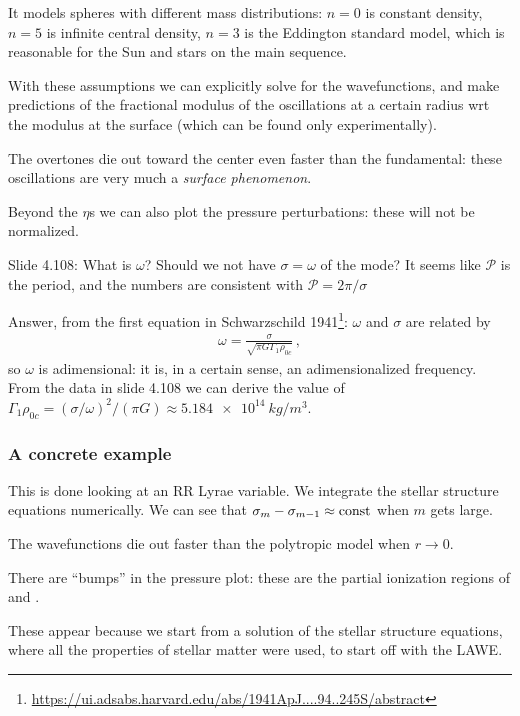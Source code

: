\documentclass[main.tex]{subfiles}
\begin{document}
It models spheres with different mass distributions:
\(n=0\) is constant density, \(n=5\) is infinite central density, \(n=3\) is the Eddington standard model, which is reasonable for the Sun and stars on the main sequence.

With these assumptions we can explicitly solve for the wavefunctions, and make predictions of the fractional modulus of the oscillations at a certain radius wrt the modulus at the surface (which can be found only experimentally).

The overtones die out toward the center even faster than the fundamental: these oscillations are very much a \emph{surface phenomenon}.

Beyond the \(\eta\)s we can also plot the pressure perturbations: these will not be normalized.

\begin{bluebox}
Slide 4.108: What is \(\omega \)? Should we not have \(\sigma = \omega \) of the mode? It seems like \(\mathcal{P}\) is the period, and the numbers are consistent with \(\mathcal{P} = 2 \pi / \sigma \)

Answer, from the first equation in Schwarzschild 1941\footnote{\url{https://ui.adsabs.harvard.edu/abs/1941ApJ....94..245S/abstract}}: \(\omega \) and \(\sigma \) are related by 
%
\begin{align}
  \omega = \frac{\sigma}{\sqrt{\pi G \Gamma_1 \rho_{0c}}}
  \,,
\end{align}
%
so \(\omega \) is adimensional: it is, in a certain sense, an adimensionalized frequency. From the data in slide 4.108 we can derive the value of \(\Gamma_1 \rho_{0c} = (\sigma / \omega )^2 / (\pi G) \approx \SI{5.184e14}{kg/m^3}\).
\end{bluebox}

\subsubsection{A concrete example}

This is done looking at an RR Lyrae variable.
We integrate the stellar structure equations numerically.
We can see that \(\sigma_m - \sigma_{m-1} \approx \text{const}\) when \(m\) gets large.

The wavefunctions die out faster than the polytropic model when \(r \rightarrow 0\).

There are ``bumps'' in the pressure plot: these are the partial ionization regions of  and .

These appear because we start from a solution of the stellar structure equations, where all the properties of stellar matter were used, to start off with the LAWE.
\end{document}
